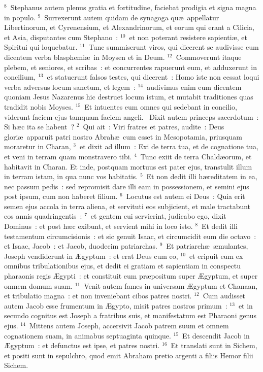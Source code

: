 ${}^{8}$~Stephanus autem plenus gratia et fortitudine, faciebat prodigia et signa magna in populo.
${}^{9}$~Surrexerunt autem quidam de synagoga qu\ae\ appellatur Libertinorum, et Cyrenensium, et Alexandrinorum, et eorum qui erant a Cilicia, et Asia, disputantes cum Stephano~:
${}^{10}$~et non poterant resistere sapienti\ae , et Spiritui qui loquebatur.
${}^{11}$~Tunc summiserunt viros, qui dicerent se audivisse eum dicentem verba blasphemi\ae\ in Moysen et in Deum.
${}^{12}$~Commoverunt itaque plebem, et seniores, et scribas~: et concurrentes rapuerunt eum, et adduxerunt in concilium,
${}^{13}$~et statuerunt falsos testes, qui dicerent~: Homo iste non cessat loqui verba adversus locum sanctum, et legem~:
${}^{14}$~audivimus enim eum dicentem quoniam Jesus Nazarenus hic destruet locum istum, et mutabit traditiones quas tradidit nobis Moyses.
${}^{15}$~Et intuentes eum omnes qui sedebant in concilio, viderunt faciem ejus tamquam faciem angeli.
~\lettrine[lines=10,image=true,loversize=0.05,lraise=-0.03]{D}{}ixit autem princeps sacerdotum~: Si h\ae c ita se habent~?
${}^{2}$~Qui ait~: Viri fratres et patres, audite~: Deus glori\ae\ apparuit patri nostro Abrah\ae\ cum esset in Mesopotamia, priusquam moraretur in Charan,
${}^{3}$~et dixit ad illum~: Exi de terra tua, et de cognatione tua, et veni in terram quam monstravero tibi.
${}^{4}$~Tunc exiit de terra Chald\ae orum, et habitavit in Charan. Et inde, postquam mortuus est pater ejus, transtulit illum in terram istam, in qua nunc vos habitatis.
${}^{5}$~Et non dedit illi h\ae reditatem in ea, nec passum pedis~: sed repromisit dare illi eam in possessionem, et semini ejus post ipsum, cum non haberet filium.
${}^{6}$~Locutus est autem ei Deus~: Quia erit semen ejus accola in terra aliena, et servituti eos subjicient, et male tractabunt eos annis quadringentis~:
${}^{7}$~et gentem cui servierint, judicabo ego, dixit Dominus~: et post h\ae c exibunt, et servient mihi in loco isto.
${}^{8}$~Et dedit illi testamentum circumcisionis~: et sic genuit Isaac, et circumcidit eum die octavo~: et Isaac, Jacob~: et Jacob, duodecim patriarchas.
${}^{9}$~Et patriarch\ae\ \ae mulantes, Joseph vendiderunt in \AE gyptum~: et erat Deus cum eo,
${}^{10}$~et eripuit eum ex omnibus tribulationibus ejus, et dedit ei gratiam et sapientiam in conspectu pharaonis regis \AE gypti~: et constituit eum pr\ae positum super \AE gyptum, et super omnem domum suam.
${}^{11}$~Venit autem fames in universam \AE gyptum et Chanaan, et tribulatio magna~: et non inveniebant cibos patres nostri.
${}^{12}$~Cum audisset autem Jacob esse frumentum in \AE gypto, misit patres nostros primum~:
${}^{13}$~et in secundo cognitus est Joseph a fratribus suis, et manifestatum est Pharaoni genus ejus.
${}^{14}$~Mittens autem Joseph, accersivit Jacob patrem suum et omnem cognationem suam, in animabus septuaginta quinque.
${}^{15}$~Et descendit Jacob in \AE gyptum~: et defunctus est ipse, et patres nostri.
${}^{16}$~Et translati sunt in Sichem, et positi sunt in sepulchro, quod emit Abraham pretio argenti a filiis Hemor filii Sichem.


